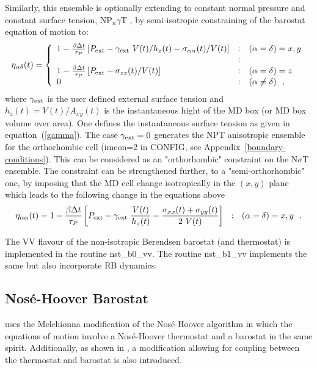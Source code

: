 Similarly, this ensemble is optionally extending to constant
normal pressure and constant surface tension, NP$_{n}\gamma$T
\cite{ikeguchi-04a}, by semi-isotropic constraining of the
barostat equation of motion to:
\begin{equation}
\eta_{\alpha\delta}(t) = \left\{ \begin{array} {l@{\quad:\quad}l}
1 - {\beta \Delta t \over \tau_{P}} \left[ P_{\rm ext} - \gamma_{\rm ext}~V(t) / h_{z}(t) -
\sigma_{\alpha\alpha}(t) / V(t) \right] & (\alpha = \delta) = x,y \\
& \\
1 - {\beta \Delta t \over \tau_{P}} \left[ P_{\rm ext} -
\sigma_{zz}(t) / V(t) \right] & (\alpha = \delta) = z \\
0 & (\alpha \ne \delta)~~,
\end{array} \right.
\end{equation}
where $\gamma_{\rm ext}$ is the user defined external surface tension
and $h_{z}(t) = V(t) / A_{xy}(t)$ is the instantaneous hight of the
MD box (or MD box volume over area).  One defines the instantaneous surface
tension as given in equation~(\ref{gamma}).  The case $\gamma_{\rm ext}=0$
generates the NPT anisotropic ensemble for the orthorhombic cell
(imcon=2 in CONFIG, see Appendix~\ref{boundary-conditions}).  This
can be considered as an "orthorhombic" constraint on the N$\sigma$T ensemble.
The constraint can be strengthened further, to a "semi-orthorhombic" one, by
imposing that the MD cell change isotropically in the $(x,y)$ plane
which leads to the following change in the equations above
\begin{equation}
\eta_{\alpha\alpha}(t) = 1 - {\beta \Delta t \over \tau_{P}}
\left[ P_{\rm ext} - \gamma_{\rm ext}~ \frac{V(t)}{h_{z}(t)} -
\frac{\sigma_{xx}(t)+\sigma_{yy}(t)}{2~V(t)} \right]~~:~~(\alpha = \delta) = x,y~~.
\end{equation}

The VV flavour of the non-isotropic Berendsen barostat (and thermostat)
is implemented in the \D routine {\sc nst\_b0\_vv}.
The routine {\sc nst\_b1\_vv} implements the
same but also incorporate RB dynamics.

\subsection{Nos\'{e}-Hoover Barostat}

\D uses the Melchionna modification of the Nos\'e-Hoover algorithm
\cite{melchionna-93a} in which the equations of motion involve a
Nos\'e-Hoover thermostat and a
barostat in the same spirit.
Additionally, as shown in \cite{martyna-94a}, a modification
allowing for coupling between the thermostat and barostat is also
introduced.

